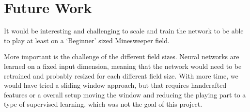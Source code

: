 \section{Future Work}
It would be interesting and challenging to scale and train the network to be able to play at least on a `Beginner' sized Minesweeper field.

More important is the challenge of the different field sizes.
Neural networks are learned on a fixed input dimension, meaning that the network would need to be retrained and probably resized for each different field size.
With more time, we would have tried a sliding window approach, but that requires handcrafted features or a overall setup moving the window and reducing the playing part to a type of supervised learning, which was not the goal of this project.
